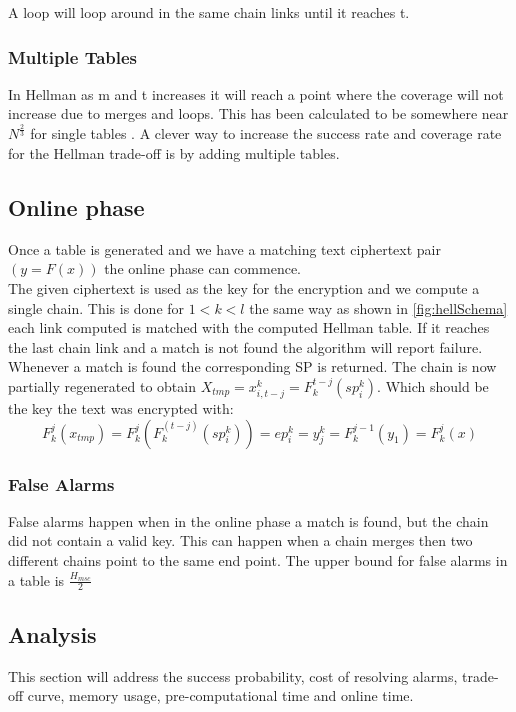 A loop will loop around in the same chain links until it reaches t.

\subsubsection{Multiple Tables}
In Hellman as m and t increases it will reach a point where the coverage will not increase due to merges and loops. This has been calculated to be somewhere near $N^{\frac{2}{3}}$ for single tables \cite{176}. A clever way to increase the success rate and coverage rate for the Hellman trade-off is by adding multiple tables.

\subsection{Online phase}
Once a table is generated and we have a matching text ciphertext pair $(y=F(x))$ the online phase can commence.\\
The given ciphertext is used as the key for the encryption and we compute a single chain. This is done for $1<k<l$ the same way as shown in \ref{fig:hellSchema} each link computed is matched with the computed Hellman table. If it reaches the last chain link and a match is not found the algorithm will report failure.\\

Whenever a match is found the corresponding SP is returned. The chain is now partially regenerated to obtain $X_{tmp}=x^k_{i,t-j}=F^{t-j}_k(sp^k_i)$. Which should be the key the text was encrypted with:
\begin{equation}
    F^j_k(x_{tmp})=F^j_k(F^(t-j)_k(sp^k_i))=ep^k_i=y^k_j=F^{j-1}_k(y_1)=F^j_k(x)
\end{equation}
\subsubsection{False Alarms}

False alarms happen when in the online phase a match is found, but the
chain did not contain a valid key. This can happen when a chain merges
then two different chains point to the same end point.
The upper bound for false alarms in a table is $\frac{H_{msc}}{2}$


\subsection{Analysis}
This section will address the success probability, cost of resolving alarms, trade-off curve, memory usage, pre-computational time and online time.

